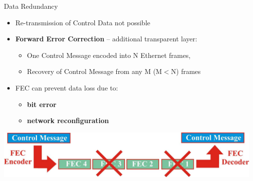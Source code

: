 \documentclass[compress,red]{beamer}
\begin{document}
\begin{frame}{Data Redundancy}

  \begin{itemize}
    \item Re-transmission of Control Data not possible
	\item {\bf Forward Error Correction}  -- additional transparent layer:
	\begin{itemize}
		\item One Control Message encoded into N Ethernet frames,
		\item Recovery of Control Message from any M (M$<$N) frames
	\end{itemize}
	\item FEC can prevent data loss due to:
	\begin{itemize}	
		\item {\bf bit error} 
		\item {\bf network reconfiguration}
	\end{itemize}	
  \end{itemize}
  
  	\begin{center}
      \includegraphics[width=.7\textwidth]{robustness/FEC.pdf}
    \end{center}
  
\end{frame}
\end{document}
